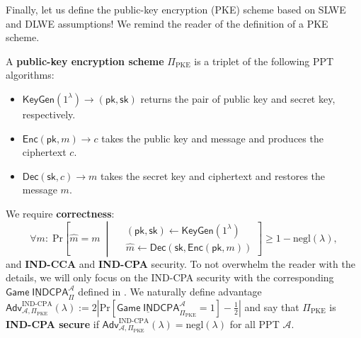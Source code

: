 \documentclass{template}
\begin{document}
Finally, let us define the public-key encryption (PKE) scheme based on SLWE and
DLWE assumptions! We remind the reader of the definition of a PKE scheme.
\begin{definition}
    A \textbf{public-key encryption scheme} $\Pi_{\text{PKE}}$ is a triplet 
    of the following PPT algorithms:
    \begin{itemize}
        \item $\mathsf{KeyGen}(1^{\lambda}) \to (\mathsf{pk},\mathsf{sk})$
        returns the pair of public key and secret key, respectively.
        \item $\mathsf{Enc}(\mathsf{pk}, m) \to c$ takes the public key and message
        and produces the ciphertext $c$.
        \item $\mathsf{Dec}(\mathsf{sk}, c) \to m$ takes the secret key and ciphertext and restores the message $m$.
    \end{itemize}
    We require \textbf{correctness}:
    \begin{equation*}
        \forall m: \; \text{Pr}\left[ \widehat{m} = m \;\middle|\; \begin{aligned}
            &(\mathsf{pk}, \mathsf{sk}) \gets \mathsf{KeyGen}(1^{\lambda}) \\
            &\widehat{m} \gets \mathsf{Dec}(\mathsf{sk}, \mathsf{Enc}(\mathsf{pk}, m))
        \end{aligned} \right] \geq 1 - \text{negl}(\lambda),
    \end{equation*}
    and \textbf{IND-CCA} and \textbf{IND-CPA} security. To not overwhelm the reader 
    with the details, we will only focus on the IND-CPA security with the corresponding $\underline{\mathsf{Game} \; \mathsf{INDCPA}}^{\mathcal{A}}_{\Pi}$ defined in . We 
    naturally define advantage $\mathsf{Adv}_{\mathcal{A},\Pi_{\text{PKE}}}^{\text{IND-CPA}}(\lambda) := 2\left|\text{Pr}[\underline{\mathsf{Game} \; \mathsf{INDCPA}}^{\mathcal{A}}_{\Pi_{\text{PKE}}} = 1] - \frac{1}{2}\right|$ and say that $\Pi_{\text{PKE}}$ is \textbf{IND-CPA secure} if $\mathsf{Adv}_{\mathcal{A},\Pi_{\text{PKE}}}^{\text{IND-CPA}}(\lambda) = \text{negl}(\lambda)$ for all PPT $\mathcal{A}$.
\end{definition}
\end{document}
